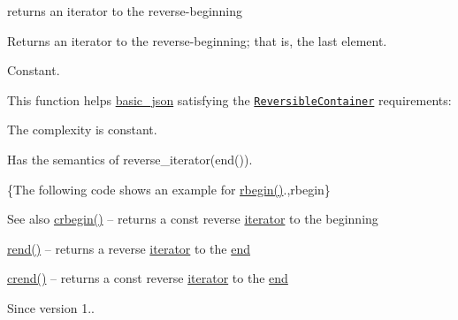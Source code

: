 returns an iterator to the reverse-\/beginning 

Returns an iterator to the reverse-\/beginning; that is, the last element.

  Constant.

This function helps {\ttfamily \hyperlink{classnlohmann_1_1basic__json}{basic\+\_\+json}} satisfying the \href{https://en.cppreference.com/w/cpp/named_req/ReversibleContainer}{\tt Reversible\+Container} requirements\+:
\begin{DoxyItemize}
\item The complexity is constant.
\item Has the semantics of {\ttfamily reverse\+\_\+iterator(end())}.
\end{DoxyItemize}

\{The following code shows an example for {\ttfamily \hyperlink{classnlohmann_1_1basic__json_aff8e38cd973bc94557fa8d36433c0e4c}{rbegin()}}.,rbegin\}

\begin{DoxySeeAlso}{See also}
\hyperlink{classnlohmann_1_1basic__json_a044298d189bdf7e4b36492de9811ddd6}{crbegin()} -- returns a const reverse \hyperlink{classnlohmann_1_1basic__json_aa549b2b382916b3baafb526e5cb410bd}{iterator} to the beginning 

\hyperlink{classnlohmann_1_1basic__json_a7a328b29b290cc300345376c54f618cb}{rend()} -- returns a reverse \hyperlink{classnlohmann_1_1basic__json_aa549b2b382916b3baafb526e5cb410bd}{iterator} to the \hyperlink{classnlohmann_1_1basic__json_a931267ec3f09eb67e4382f321b2c52bc}{end} 

\hyperlink{classnlohmann_1_1basic__json_a223480466a0922267d680ec8f0722d58}{crend()} -- returns a const reverse \hyperlink{classnlohmann_1_1basic__json_aa549b2b382916b3baafb526e5cb410bd}{iterator} to the \hyperlink{classnlohmann_1_1basic__json_a931267ec3f09eb67e4382f321b2c52bc}{end}
\end{DoxySeeAlso}
\begin{DoxySince}{Since}
version 1.. 
\end{DoxySince}
